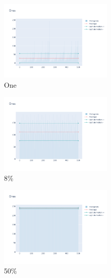 \documentclass[12pt, fleqn]{report}                             %
\theoremstyle{break}                                            %
\begin{document}
      \begin{figure}[ht!]
        \centering
        \begin{subfigure}[b]{0.4\linewidth}
          \includegraphics[width=0.6\textwidth]{Images/154/dia-a.png}
          \caption{One}
        \end{subfigure}
        \begin{subfigure}[b]{0.4\linewidth}
          \includegraphics[width=0.6\textwidth]{Images/154/dia-b.png}
          \caption{8\%}
        \end{subfigure}
        \begin{subfigure}[b]{0.4\linewidth}
          \includegraphics[width=0.6\textwidth]{Images/154/dia-c.png}
          \caption{50\%}
        \end{subfigure}
        \begin{subfigure}[b]{0.4\linewidth}

\end{subfigure}
\end{figure}
\end{document}
